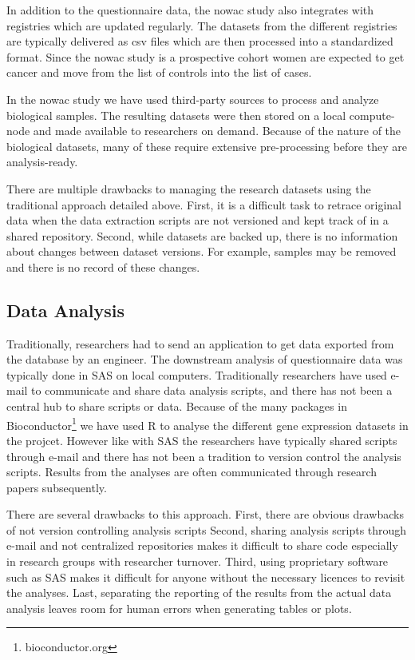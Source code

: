 In addition to the questionnaire data, the \gls{nowac} study also integrates
with registries which are updated regularly. The datasets from the different
registries are typically delivered as \gls{csv} files which are then processed
into a standardized format. Since the \gls{nowac} study is a prospective cohort
women are expected to get cancer and move from the list of controls into the
list of cases. 

In the \gls{nowac} study we have used third-party sources to process and analyze
biological samples. The resulting datasets were then stored on a local
compute-node and made available to researchers on demand. Because of the nature
of the biological datasets, many of these require extensive pre-processing
before they are analysis-ready. 

There are multiple drawbacks to managing the research datasets using the
traditional approach detailed above. First, it is a difficult task to retrace
original data when the data extraction scripts are not versioned and kept track
of in a shared repository. Second, while datasets are backed up, there is no
information about changes between dataset versions. For example, samples may be
removed and there is no record of these changes. 

\subsection{Data Analysis} 
Traditionally, researchers had to send an application to get data exported from
the database by an engineer. The downstream analysis of questionnaire data was
typically done in SAS on local computers.  Traditionally researchers have used
e-mail to communicate and share data analysis scripts, and there has not been a
central hub to share scripts or data. Because of the many packages in
Bioconductor\footnote{bioconductor.org} we have used R to analyse the different
gene expression datasets in the projcet. However like with SAS the researchers
have typically shared scripts through e-mail and there has not been a tradition
to version control the analysis scripts. Results from the analyses are often
communicated through research papers subsequently. 

There are several drawbacks to this approach. First, there are obvious drawbacks
of not version controlling analysis scripts 
Second, sharing analysis scripts through e-mail and not centralized repositories
makes it difficult to share code especially in research groups with researcher
turnover. 
Third, using proprietary software
such as SAS makes it difficult for anyone without the necessary licences to
revisit the analyses. Last, separating the reporting of the results from the
actual data analysis leaves room for human errors when generating tables or
plots. 



